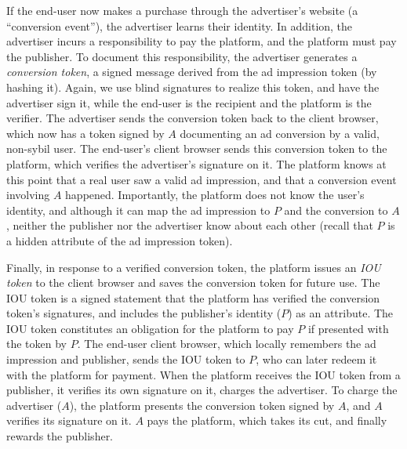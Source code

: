 %
If the end-user now makes a purchase through the advertiser's website (a ``conversion event''), the advertiser learns their identity.
%
In addition, the advertiser incurs a responsibility to pay the platform, and the platform must pay the publisher.
%
To document this responsibility, the advertiser generates a \emph{conversion token}, a signed message derived from the ad impression token (\eg by hashing it).
%
Again, we use blind signatures to realize this token, and have the advertiser sign it, while the end-user is the recipient and the platform is the verifier.
%
The advertiser sends the conversion token back to the client browser, which now has a token signed by $A$ documenting an ad conversion by a valid, non-sybil user.
%
The end-user's client browser sends this conversion token to the platform, which verifies the advertiser's signature on it.
%
The platform knows at this point that a real user saw a valid ad impression, and that a conversion event involving $A$ happened.
%
Importantly, the platform does not know the user's identity, and although it can map the ad impression to $P$ and the conversion to $A$, neither the publisher nor the advertiser know about each other (recall that $P$ is a hidden attribute of the ad impression token).
%

%
Finally, in response to a verified conversion token, the platform issues an \emph{IOU token} to the client browser and saves the conversion token for future use.
%
The IOU token is a signed statement that the platform has verified the conversion token's signatures, and includes the publisher's identity ($P$) as an attribute.
%
The IOU token constitutes an obligation for the platform to pay $P$ if presented with the token by $P$.
%
The end-user client browser, which locally remembers the ad impression and publisher, sends the IOU token to $P$, who can later redeem it with the platform for payment.
%
When the platform receives the IOU token from a publisher, it verifies its own signature on it, charges the advertiser.
%
To charge the advertiser ($A$), the platform presents the conversion token signed by $A$, and $A$ verifies its signature on it.
%
$A$ pays the platform, which takes its cut, and finally rewards the publisher.
%

